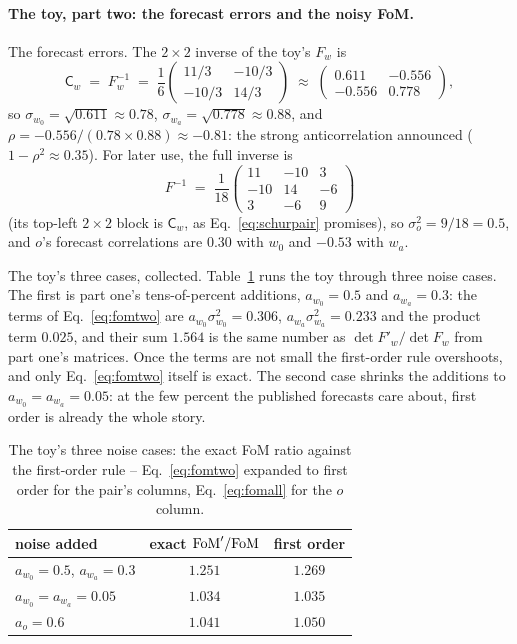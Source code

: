 \documentclass[11pt]{article}
\newcommand{\Cov}{\mathsf{C}}
\begin{document}
\paragraph{The toy, part two: the forecast errors and the noisy FoM.}
The forecast errors.  The $2 \times 2$ inverse of the toy's $F_w$ is
\begin{equation*}
  \Cov_w \;=\; F_w^{-1} \;=\; \frac{1}{6}
  \begin{pmatrix} 11/3 & -10/3 \\ -10/3 & 14/3 \end{pmatrix}
  \;\approx\;
  \begin{pmatrix} 0.611 & -0.556 \\ -0.556 & 0.778 \end{pmatrix} ,
\end{equation*}
so $\sigma_{w_0} = \sqrt{0.611} \approx 0.78$,
$\sigma_{w_a} = \sqrt{0.778} \approx 0.88$, and
$\rho = -0.556/(0.78 \times 0.88) \approx -0.81$: the strong
anticorrelation announced ($1 - \rho^2 \approx 0.35$).  For later use,
the full inverse is
\begin{equation*}
  F^{-1} \;=\; \frac{1}{18}
  \begin{pmatrix} 11 & -10 & 3 \\ -10 & 14 & -6 \\ 3 & -6 & 9
  \end{pmatrix}
\end{equation*}
(its top-left $2 \times 2$ block is $\Cov_w$, as
Eq.~\eqref{eq:schurpair} promises), so $\sigma_o^2 = 9/18 = 0.5$, and
$o$'s forecast correlations are $0.30$ with $w_0$ and $-0.53$ with
$w_a$.

The toy's three cases, collected.  Table~\ref{tab:toycases} runs the
toy through three noise cases.  The first is part one's
tens-of-percent additions, $a_{w_0} = 0.5$ and $a_{w_a} = 0.3$: the
terms of Eq.~\eqref{eq:fomtwo} are $a_{w_0}\sigma_{w_0}^2 = 0.306$,
$a_{w_a}\sigma_{w_a}^2 = 0.233$ and the product term $0.025$, and
their sum $1.564$ is the same number as $\det F'_w/\det F_w$ from
part one's matrices.  Once the terms are not small the first-order
rule overshoots, and only Eq.~\eqref{eq:fomtwo} itself is exact.  The
second case shrinks the additions to $a_{w_0} = a_{w_a} = 0.05$: at
the few percent the published forecasts care about, first order is
already the whole story.

\begin{table}[tbp]
  \centering
  \begin{tabular}{lcc}
    \hline
    noise added & exact ${\rm FoM}'/{\rm FoM}$ & first order \\
    \hline
    $a_{w_0} = 0.5$, $a_{w_a} = 0.3$ & $1.251$ & $1.269$ \\
    $a_{w_0} = a_{w_a} = 0.05$       & $1.034$ & $1.035$ \\
    $a_o = 0.6$                      & $1.041$ & $1.050$ \\
    \hline
  \end{tabular}
  \caption{The toy's three noise cases: the exact FoM ratio against
    the first-order rule -- Eq.~\eqref{eq:fomtwo} expanded to first
    order for the pair's columns, Eq.~\eqref{eq:fomall} for the $o$
    column.}
  \label{tab:toycases}
\end{table}
\end{document}

